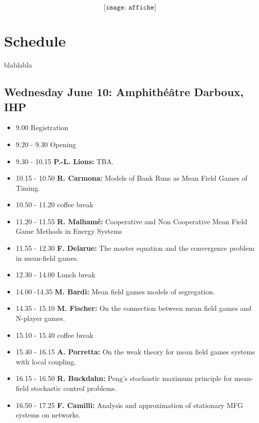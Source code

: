 \documentclass[11pt]{article}
\begin{document}
\[
\texttt{[image: affiche]}
\]
\vfill\eject
\section*{Schedule}
blablabla  


\subsection*{Wednesday June  10: Amphith{\'e}{\^a}tre Darboux, IHP}
\begin{itemize}
\item 9.00  Registration 
\item 9.20 - 9.30  Opening
\item 9.30 - 10.15  {\bf P.-L. Lions:}  TBA.
\item 10.15 - 10.50  {\bf R. Carmona:}  Models of Bank Runs as Mean Field Games of Timing. 
\item 10.50 - 11.20   coffee break
\item 11.20 - 11.55  {\bf R. Malham{\' e}:}   Cooperative and Non Cooperative Mean Field Game Methods in Energy Systems 
\item 11.55 - 12.30  {\bf F. Delarue:}  The master equation and the convergence problem in mean-field games.
\item 12.30 - 14.00  Lunch break
\item 14.00 -14.35 {\bf  M. Bardi:} Mean field games models of segregation.
\item 14.35 - 15.10 {\bf M. Fischer:} On the connection between mean field games and N-player games. 
\item 15.10 - 15.40  coffee break
\item 15.40 - 16.15  {\bf  A. Porretta:} On the weak theory for mean field games systems with local coupling. 
\item 16.15 - 16.50 {\bf  R. Buckdahn:} Peng's stochastic maximum principle for mean-field stochastic control problems. 
\item 16.50 - 17.25 {\bf  F. Camilli:} Analysis and approximation of   stationary MFG systems  on  networks.
\end{itemize}
\vfill\eject
\end{document}
